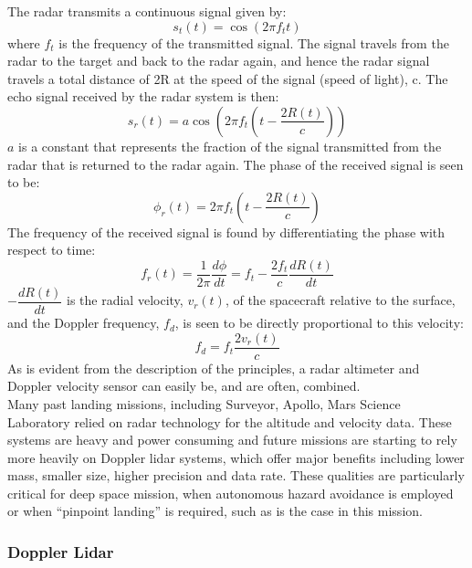 \noindent
The radar transmits a continuous signal given by:
\begin{equation}
s_t(t)=\cos (2 \pi f_t t)
\end{equation}
where $f_t$ is the frequency of the transmitted signal. The signal travels
from the radar to the target and back to the radar again, and hence the radar signal
travels a total distance of 2R at the speed of the signal (speed of light), c. The echo signal received by the radar system is then:
\begin{equation}
s_r(t)=a \cos(2 \pi f_t(t-\dfrac{2R(t)}{c}))
\end{equation}
$a$ is a constant that represents the fraction of the signal transmitted from the radar
that is returned to the radar again. The phase of the received signal is seen to be:
\begin{equation}
\phi_r(t)=2 \pi f_t(t-\dfrac{2R(t)}{c})
\end{equation}
The frequency of the received signal is found by differentiating the phase with respect
to time:
\begin{equation}
f_r(t)=\dfrac{1}{2 \pi}\dfrac{d\phi}{dt} = f_t - \dfrac{2 f_t}{c}\dfrac{dR(t)}{dt}
\end{equation}
$-\dfrac{dR(t)}{dt}$ is the radial velocity, $v_r(t)$, of the spacecraft relative to the surface, and the Doppler frequency, $f_d$, is seen to be directly proportional to this velocity:
\begin{equation}
f_d= f_t\dfrac{2 v_r(t)}{c}
\end{equation}
As is evident from the description of the principles, a radar altimeter and Doppler velocity sensor can easily be, and are often, combined. \\

\noindent
Many past landing missions, including Surveyor, Apollo, Mars Science Laboratory relied on radar
technology for the altitude and velocity data. These systems are heavy and power consuming and future missions are starting to rely more heavily on Doppler lidar systems, which offer major benefits including lower mass, smaller
size, higher precision and data rate. These qualities are particularly critical for deep space mission, when autonomous hazard avoidance is employed or when “pinpoint landing” is required, such as is the case in this mission.

\subsubsection{Doppler Lidar}


